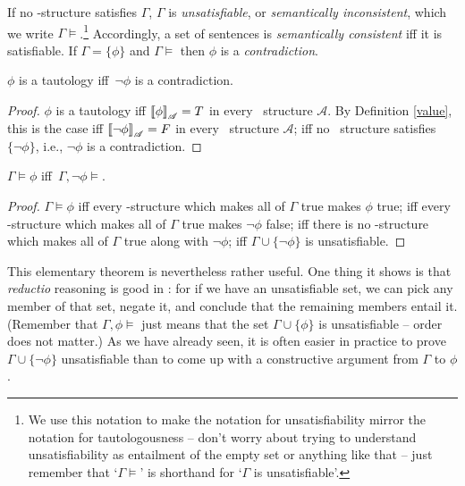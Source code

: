 If no \lone-structure satisfies $\Gamma$,  $\Gamma$ is \emph{unsatisfiable}, or \emph{semantically inconsistent}, which we write $\Gamma\vDash$.\footnote{We use this notation to make the notation for unsatisfiability mirror the notation for tautologousness – don't worry about trying to understand unsatisfiability as entailment of the empty set or anything like that – just remember that `$\Gamma \vDash$' is shorthand for `$\Gamma$ is unsatisfiable'.} Accordingly, a set of sentences is \emph{semantically consistent} iff it is satisfiable. If $\Gamma = \{\phi\}$ and $\Gamma \vDash$ then $\phi$ is a \emph{contradiction}.
\begin{theorem}
	$\phi$ is a tautology iff\, $\neg\phi$ is a contradiction.
	\begin{proof}
		$\phi$ is a tautology iff $\left\llbracket \phi\right\rrbracket_{\mathscr{A}} =T$ in every \lone\ structure $\mathscr{A}$. By Definition \ref{value}, this is the case iff $\left\llbracket \neg\phi\right\rrbracket_{\mathscr{A}}=F$ in every \lone\ structure $\mathscr{A}$; iff no \lone\ structure satisfies $\{\neg\phi\}$, i.e., $\neg\phi$ is a contradiction. 
	\end{proof}
\end{theorem}

\begin{theorem}\label{entuns}
	$\Gamma\vDash\phi$ iff\, $\Gamma,¬\phi\vDash$.
	\begin{proof}
		$\Gamma\vDash \phi$ iff every \lone-structure which makes all of $\Gamma$ true makes $\phi$ true; iff every \lone-structure which makes all of $\Gamma$ true makes $¬\phi$ false; iff there is no \lone-structure which makes all of $\Gamma$ true along with $¬\phi$; iff $\Gamma\cup\{¬\phi\}$ is unsatisfiable.
	\end{proof}
\end{theorem}
This elementary theorem is nevertheless rather useful. One thing it shows is that \emph{reductio} reasoning is good in \lone: for if we have an unsatisfiable set, we can pick any member of that set, negate it,  and conclude that the remaining members entail it. (Remember that $\Gamma,\phi\vDash$ just means that the set $\Gamma\cup\{\phi\}$ is unsatisfiable – order does not matter.) As we have already seen, it is often easier in practice to prove $\Gamma\cup\{¬\phi\}$ unsatisfiable than to come up with a constructive argument from $\Gamma$ to $\phi$.

